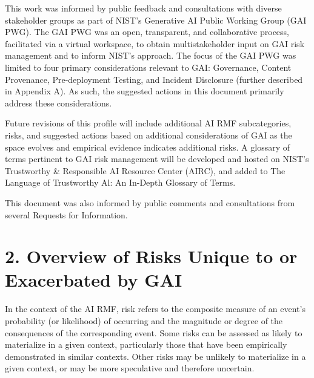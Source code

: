 \documentclass[10pt]{article}
\begin{document}
This work was informed by public feedback and consultations with diverse stakeholder groups as part of NIST's Generative AI Public Working Group (GAI PWG). The GAI PWG was an open, transparent, and collaborative process, facilitated via a virtual workspace, to obtain multistakeholder input on GAI risk management and to inform NIST's approach.
The focus of the GAI PWG was limited to four primary considerations relevant to GAI: Governance, Content Provenance, Pre-deployment Testing, and Incident Disclosure (further described in Appendix A). As such, the suggested actions in this document primarily address these considerations.

Future revisions of this profile will include additional AI RMF subcategories, risks, and suggested actions based on additional considerations of GAI as the space evolves and empirical evidence indicates additional risks. A glossary of terms pertinent to GAI risk management will be developed and hosted on NIST's Trustworthy \& Responsible AI Resource Center (AIRC), and added to The Language of Trustworthy Al: An In-Depth Glossary of Terms.

This document was also informed by public comments and consultations from several Requests for Information.
\section*{2. Overview of Risks Unique to or Exacerbated by GAI}
In the context of the AI RMF, risk refers to the composite measure of an event's probability (or likelihood) of occurring and the magnitude or degree of the consequences of the corresponding event. Some risks can be assessed as likely to materialize in a given context, particularly those that have been empirically demonstrated in similar contexts. Other risks may be unlikely to materialize in a given context, or may be more speculative and therefore uncertain.
\end{document}
